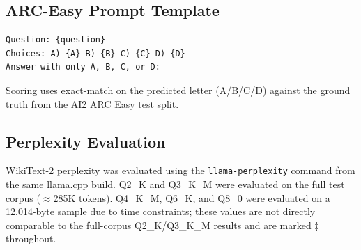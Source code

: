 \documentclass[conference]{IEEEtran}
\begin{document}
\subsection{ARC-Easy Prompt Template}

\begin{verbatim}
Question: {question}
Choices: A) {A} B) {B} C) {C} D) {D}
Answer with only A, B, C, or D:
\end{verbatim}

Scoring uses exact-match on the predicted letter (A/B/C/D) against the
ground truth from the AI2 ARC Easy test split.

\subsection{Perplexity Evaluation}

WikiText-2 perplexity was evaluated using the \texttt{llama-perplexity}
command from the same llama.cpp build. Q2\_K and Q3\_K\_M were evaluated
on the full test corpus (${\approx}$285K tokens). Q4\_K\_M, Q6\_K, and Q8\_0
were evaluated on a 12,014-byte sample due to time constraints; these values
are not directly comparable to the full-corpus Q2\_K/Q3\_K\_M results and
are marked $\ddagger$ throughout.
\end{document}
